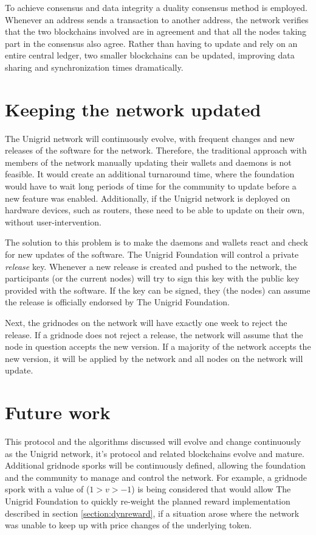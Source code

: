 \documentclass[10pt,a4paper,final]{article}
\begin{document}
To achieve consensus and data integrity a duality consensus method is employed. Whenever an address sends a transaction to another address, the network verifies that the two blockchains involved are in agreement and that all the nodes taking part in the consensus also agree. Rather than having to update and rely on an entire central ledger, two smaller blockchains can be updated, improving data sharing and synchronization times dramatically.

\section{Keeping the network updated}
The Unigrid network will continuously evolve, with frequent changes and new releases of the software for the network. Therefore, the traditional approach with members of the network manually updating their wallets and daemons is not feasible. It would create an additional turnaround time, where the foundation would have to wait long periods of time for the community to update before a new feature was enabled. Additionally, if the Unigrid network is deployed on hardware devices, such as routers, these need to be able to update on their own, without user-intervention.

The solution to this problem is to make the daemons and wallets react and check for new updates of the software. The Unigrid Foundation will control a private \emph{release} key. Whenever a new release is created and pushed to the network, the participants (or the current nodes) will try to sign this key with the public key provided with the software. If the key can be signed, they (the nodes) can assume the release is officially endorsed by The Unigrid Foundation.

Next, the \glspl{gridnode} on the network will have exactly one week to reject the release. If a \gls{gridnode} does not reject a release, the network will assume that the node in question accepts the new version. If a majority of the network accepts the new version, it will be applied by the network and all nodes on the network will update.

\pagebreak
\section{Future work}
This protocol and the algorithms discussed will evolve and change continuously as the Unigrid network, it's protocol and related blockchains evolve and mature. Additional \gls{gridnode} sporks will be continuously defined, allowing the foundation and the community to manage and control the network. For example, a \gls{gridnode} spork with a value of ($1 > v > -1$) is being considered that would allow The Unigrid Foundation to quickly re-weight the planned reward implementation described in section \ref{section:dynreward}, if a situation arose where the network was unable to keep up with price changes of the underlying token.
\end{document}
